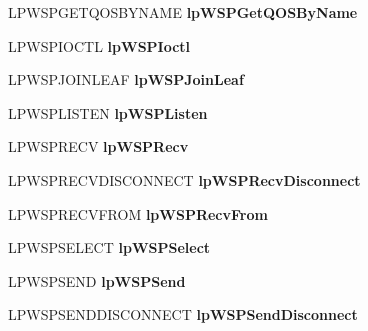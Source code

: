 \begin{DoxyCompactItemize}
L\+P\+W\+S\+P\+G\+E\+T\+Q\+O\+S\+B\+Y\+N\+A\+ME {\bfseries lp\+W\+S\+P\+Get\+Q\+O\+S\+By\+Name}
\item 
\mbox{\label{struct___w_s_p_p_r_o_c___t_a_b_l_e_a89fdd513120b149431c8b22bd5027b5f}} 
L\+P\+W\+S\+P\+I\+O\+C\+TL {\bfseries lp\+W\+S\+P\+Ioctl}
\item 
\mbox{\label{struct___w_s_p_p_r_o_c___t_a_b_l_e_a559e3f335b01ddad7e1dce7f8ff51093}} 
L\+P\+W\+S\+P\+J\+O\+I\+N\+L\+E\+AF {\bfseries lp\+W\+S\+P\+Join\+Leaf}
\item 
\mbox{\label{struct___w_s_p_p_r_o_c___t_a_b_l_e_af28162b86e327d54f9a53eda9999862e}} 
L\+P\+W\+S\+P\+L\+I\+S\+T\+EN {\bfseries lp\+W\+S\+P\+Listen}
\item 
\mbox{\label{struct___w_s_p_p_r_o_c___t_a_b_l_e_a0e6ef8813cedee413fa36882d5d6990f}} 
L\+P\+W\+S\+P\+R\+E\+CV {\bfseries lp\+W\+S\+P\+Recv}
\item 
\mbox{\label{struct___w_s_p_p_r_o_c___t_a_b_l_e_a55f3cb8aa5430d1c667ffd4b8db6a27e}} 
L\+P\+W\+S\+P\+R\+E\+C\+V\+D\+I\+S\+C\+O\+N\+N\+E\+CT {\bfseries lp\+W\+S\+P\+Recv\+Disconnect}
\item 
\mbox{\label{struct___w_s_p_p_r_o_c___t_a_b_l_e_a7cecaec555487468e267b1aa85b3f7c0}} 
L\+P\+W\+S\+P\+R\+E\+C\+V\+F\+R\+OM {\bfseries lp\+W\+S\+P\+Recv\+From}
\item 
\mbox{\label{struct___w_s_p_p_r_o_c___t_a_b_l_e_a7a951ba74e30b58fe4c6423da7c2f343}} 
L\+P\+W\+S\+P\+S\+E\+L\+E\+CT {\bfseries lp\+W\+S\+P\+Select}
\item 
\mbox{\label{struct___w_s_p_p_r_o_c___t_a_b_l_e_acd846fb1f86bb9bd573661631f62ad4b}} 
L\+P\+W\+S\+P\+S\+E\+ND {\bfseries lp\+W\+S\+P\+Send}
\item 
\mbox{\label{struct___w_s_p_p_r_o_c___t_a_b_l_e_a631997e89480fd10445bbbfd8a0a23c3}} 
L\+P\+W\+S\+P\+S\+E\+N\+D\+D\+I\+S\+C\+O\+N\+N\+E\+CT {\bfseries lp\+W\+S\+P\+Send\+Disconnect}

\end{DoxyCompactItemize}
